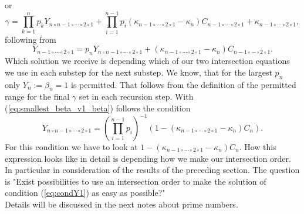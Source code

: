 \documentclass{amsart}
\begin{document}
or
\begin{equation}
	\gamma = \prod_{k=1}^{n}p_{k}Y_{n \circ n-1 \circ \cdots \circ 2 \circ 1} + \prod_{i=1}^{n-1}p_{i}\left(\kappa_{n-1 \circ \cdots \circ 2 \circ 1} - \kappa_{n}\right)C_{n-1 \circ \cdots \circ 2 \circ 1} + \kappa_{n-1 \circ \cdots \circ 2 \circ 1},
\label{eq:smallest_beta_v2}\end{equation}
following from
\begin{equation}
	Y_{n-1\circ \cdots \circ 2 \circ 1} = p_{n}Y_{n \circ n-1 \circ \cdots \circ 2 \circ 1} + \left(\kappa_{n-1 \circ \cdots \circ 2 \circ 1} - \kappa_{n}\right)C_{n-1 \circ \cdots \circ 2 \circ 1}.
\label{eq:smallest_beta_v2_beta}\end{equation}
Which solution we receive is depending which of our two intersection equations we use in each substep for the next substep. We know, that for the largest $p_{n}$ only $Y_{n} := \beta_{n} = 1$ is permitted. That follows from the definition of the permitted range for the final $\gamma$ set in each recursion step. With (\ref{eq:smallest_beta_v1_beta}) follows the condition
\begin{equation}
	Y_{n \circ n-1 \circ \cdots \circ 2 \circ 1} = \left(\prod_{i=1}^{n-1}p_{i}\right)^{-1}\left(1 - \left(\kappa_{n-1 \circ \cdots \circ 2 \circ 1} - \kappa_{n}\right)C_{n}\right).
\label{eq:condY1}\end{equation}
For this condition we have to look at $1-\left(\kappa_{n-1 \circ \cdots \circ 2 \circ 1} - \kappa_{n}\right)C_{n}$. How this expression looks like in detail is depending how we make our intersection order. In particular in consideration of the results of the preceding section. The question is "Exist possibilities to use an intersection order to make the solution of condition (\ref{eq:condY1}) as easy as possible?"\\
Details will be discussed in the next notes about prime numbers.


\end{document}
